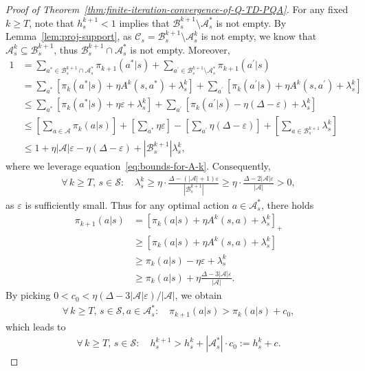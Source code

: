 \documentclass[10pt]{article}
\newcommand{\calA}{\mathcal{A}}
\newcommand{\calB}{\mathcal{B}}
\newcommand{\calS}{\mathcal{S}}
\newcommand{\ls}{\left}
\newcommand{\rs}{\right}
\theoremstyle{plain}
\theoremstyle{definition}
\begin{document}
\begin{proof}[Proof of Theorem~\ref{thm:finite-iteration-convergence-of-Q-TD-PQA}]
    For any  fixed  $k \geq T$, note  that $h_s^{k+1} < 1$ implies that $\calB^{k+1}_s \setminus \calA^*_s$ is not empty. By Lemma~\ref{lem:proj-support}, as $\mathcal{C}_s = \calB_s^{k+1} \setminus \calA^k_s$ is not empty, we know that $\calA^k_s \subseteq \calB^{k+1}_s$, thus $\calB_s^{k+1} \cap \calA^*_s$ is not empty. Moreover,
    \begin{align*}
        1 &= \sum_{a^*\in\calB^{k+1}_s \cap \calA^*_s} \pi_{k+1}(a^*|s) + \sum_{a^\prime \in \calB^{k+1}_s \setminus \calA^*_s} \pi_{k+1}(a^\prime|s) \\
        &= \sum_{a^*} \ls[ \pi_k(a^*|s) + \eta A^k(s,a^*) + \lambda_s^k \rs] + \sum_{a^\prime} \ls[ \pi_k(a^\prime|s) + \eta A^k(s,a^\prime) + \lambda_s^k \rs] \\
        &\leq \sum_{a^*} \ls[ \pi_k(a^*|s) + \eta \varepsilon + \lambda_s^k \rs] + \sum_{a^\prime} \ls[ \pi_k(a^\prime|s) - \eta (\Delta - \varepsilon) + \lambda_s^k \rs] \\
        &\leq \ls[\sum_{a\in\calA} \pi_k(a|s)\rs] +  \ls[\sum_{a^*} \eta\varepsilon \rs] - \ls[ \sum_{a^\prime} \eta (\Delta - \varepsilon) \rs] + \ls[ \sum_{a \in \calB^{k+1}_s} \lambda_s^k \rs] \\
        &\leq 1 + \eta |\calA| \varepsilon - \eta (\Delta-\varepsilon) + |\calB^{k+1}_s| \lambda_s^k,
    \end{align*}
    where we leverage equation~\eqref{eq:bounds-for-A-k}. Consequently,
    \begin{align*}
        \forall\, k\geq T, \, s\in\calS: \quad  \lambda_s^k \geq \eta \cdot \frac{\Delta - (|\calA|+1)\varepsilon}{|\calB_s^{k+1}|} \geq \eta \cdot \frac{\Delta - 2|\calA|\varepsilon}{|\calA|} > 0,
    \end{align*}
    as $\varepsilon$ is sufficiently small. Thus for any optimal action $a \in \calA^*_s$, there holds
    \begin{align*}
        \pi_{k+1}(a|s) &= \ls[ \pi_k(a|s) + \eta A^k(s,a) + \lambda_s^k \rs]_+ \\
        &\geq \ls[ \pi_k(a|s) + \eta A^k(s,a) + \lambda_s^k \rs] \\ 
        &\geq \pi_k(a|s) - \eta \varepsilon + \lambda_s^k \\
        &\geq \pi_k(a|s) + \eta \frac{\Delta - 3|\calA|\varepsilon}{|\calA|}.
    \end{align*}
    By picking $0 < c_0 < \eta(\Delta - 3 |\calA| \varepsilon) / |\calA|$, we obtain
    \begin{align*}
        \forall\, k \geq T, \, s\in\calS, a\in\calA^*_s: \quad \pi_{k+1}(a|s) > \pi_k(a|s) + c_0,
    \end{align*}
    which leads to
    \begin{align*}
        \forall\, k\geq T, \, s\in\calS: \quad h_{s}^{k+1} > h_s^k + |\calA^*_s| \cdot c_0 := h_s^k + c.
    \end{align*}


\end{proof}
\end{document}
